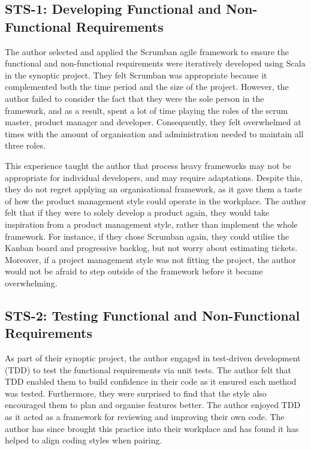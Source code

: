 \documentclass{article}
\begin{document}
\subsection{STS-1: Developing Functional and Non-Functional Requirements}

The author selected and applied the Scrumban agile framework to ensure the functional and non-functional requirements were iteratively developed using Scala in the synoptic project. They felt Scrumban was appropriate because it complemented both the time period and the size of the project. However, the author failed to consider the fact that they were the sole person in the framework, and as a result, spent a lot of time playing the roles of the scrum master, product manager and developer. Consequently, they felt overwhelmed at times with the amount of organisation and administration needed to maintain all three roles. 

This experience taught the author that process heavy frameworks may not be appropriate for individual developers, and may require adaptations. Despite this, they do not regret applying an organisational framework, as it gave them a taste of how the product management style could operate in the workplace. The author felt that if they were to solely develop a product again, they would take inspiration from a product management style, rather than implement the whole framework. For instance, if they chose Scrumban again, they could utilise the Kanban board and progressive backlog, but not worry about estimating tickets. Moreover, if a project management style was not fitting the project, the author would not be afraid to step outside of the framework before it became overwhelming.

\subsection{STS-2: Testing Functional and Non-Functional Requirements}

As part of their synoptic project, the author engaged in test-driven development (TDD) to test the functional requirements via unit tests. The author felt that TDD enabled them to build confidence in their code as it ensured each method was tested. Furthermore, they were surprised to find that the style also encouraged them to plan and organise features better. The author enjoyed TDD as it acted as a framework for reviewing and improving their own code. The author has since brought this practice into their workplace and has found it has helped to align coding styles when pairing.
\end{document}
